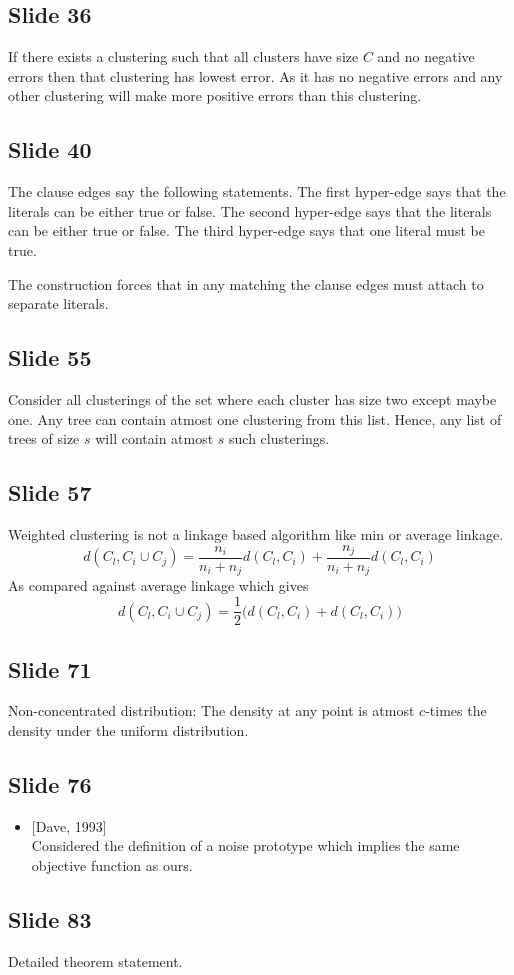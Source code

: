 \documentclass[12pt]{article}
\begin{document}
\subsection*{Slide 36}
If there exists a clustering such that all clusters have size $C$ and no negative errors then that clustering has lowest error. As it has no negative errors and any other clustering will make more positive errors than this clustering. 

\subsection*{Slide 40}
The clause edges say the following statements. The first hyper-edge says that the literals can be either true or false. The second hyper-edge says that the literals can be either true or false. The third hyper-edge says that one literal must be true.

The construction forces that in any matching the clause edges must attach to separate literals. 

\subsection*{Slide 55}
Consider all clusterings of the set where each cluster has size two except maybe one. Any tree can contain atmost one clustering from this list. Hence, any list of trees of size $s$ will contain atmost $s$ such clusterings.


\subsection*{Slide 57}
Weighted clustering is not a linkage based algorithm like min or average linkage. 
$$d(C_l, C_i \cup C_j) = \frac{n_i}{n_i + n_j} d(C_l, C_i) + \frac{n_j}{n_i+n_j}d(C_l, C_i)$$
As compared against average linkage which gives
$$d(C_l, C_i \cup C_j) = \frac{1}{2} \Big(d(C_l, C_i) + d(C_l, C_i) \Big)$$

\subsection*{Slide 71}
Non-concentrated distribution: The density at any point is atmost $c$-times the density under the uniform distribution.

\subsection*{Slide 76}
\begin{itemize}
	\item $[$Dave, 1993$]$\\
	Considered the definition of a noise prototype which implies the same objective function as ours.
\end{itemize}

\subsection*{Slide 83}
Detailed theorem statement.
\end{document}
